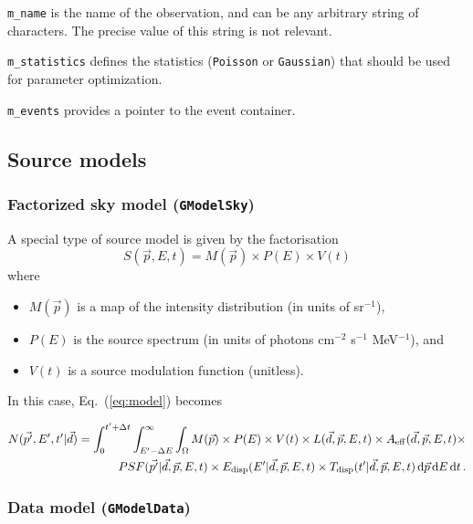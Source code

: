 \documentclass{article}[12pt,a4]
\begin{document}
{\tt m\_name} is the name of the observation, and can be any arbitrary string of
characters.
The precise value of this string is not relevant.

{\tt m\_statistics} defines the statistics ({\tt Poisson} or {\tt Gaussian}) that should be used
for parameter optimization.

{\tt m\_events} provides a pointer to the event container.


\subsection{Source models}

\subsubsection{Factorized sky model ({\tt GModelSky})}

A special type of source model is given by the factorisation
\begin{equation}
S(\vec{p}, E, t) = M(\vec{p}) \times P(E) \times V(t)
\end{equation}
where
\begin{itemize}
\item[] $M(\vec{p})$ is a map of the intensity distribution (in units of sr$^{-1}$),
\item[] $P(E)$ is the source spectrum (in units of photons cm$^{-2}$ s$^{-1}$ MeV$^{-1}$), and
\item[] $V(t)$ is a source modulation function (unitless).
\end{itemize}
In this case, Eq.~(\ref{eq:model}) becomes

\begin{eqnarray}
N(\vec{p'}, E', t' | \vec{d}) = \int_{0}^{t'+\Delta t} \int_{E'-\Delta E}^{\infty} \int_{\Omega} 
M(\vec{p}) \times P(E) \times V(t) \times 
L(\vec{d}, \vec{p}, E, t) \times
A_{\rm eff}(\vec{d}, \vec{p}, E, t) \times \nonumber \\
PSF(\vec{p'} | \vec{d}, \vec{p}, E, t) \times
E_{\rm disp}(E' | \vec{d}, \vec{p}, E, t) \times
T_{\rm disp}(t' | \vec{d}, \vec{p}, E, t) 
\, {\rm d}\vec{p} \, {\rm d}E \, {\rm d}t \, .
\end{eqnarray}

\subsubsection{Data model ({\tt GModelData})}
\end{document}
